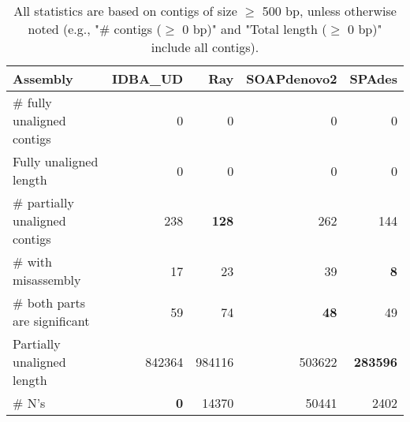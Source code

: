 \documentclass[12pt,a4paper]{article}
\begin{document}
\begin{table}[ht]
\begin{center}
\caption{All statistics are based on contigs of size $\geq$ 500 bp, unless otherwise noted (e.g., "\# contigs ($\geq$ 0 bp)" and "Total length ($\geq$ 0 bp)" include all contigs).}
\begin{tabular}{|l*{4}{|r}|}
\hline
Assembly & IDBA\_UD & Ray & SOAPdenovo2 & SPAdes \\ \hline
\# fully unaligned contigs & 0 & 0 & 0 & 0 \\ \hline
Fully unaligned length & 0 & 0 & 0 & 0 \\ \hline
\# partially unaligned contigs & 238 & {\bf 128} & 262 & 144 \\ \hline
\hspace{5mm}\# with misassembly & 17 & 23 & 39 & {\bf 8} \\ \hline
\hspace{5mm}\# both parts are significant & 59 & 74 & {\bf 48} & 49 \\ \hline
Partially unaligned length & 842364 & 984116 & 503622 & {\bf 283596} \\ \hline
\# N's & {\bf 0} & 14370 & 50441 & 2402 \\ \hline
\end{tabular}
\end{center}
\end{table}
\end{document}
